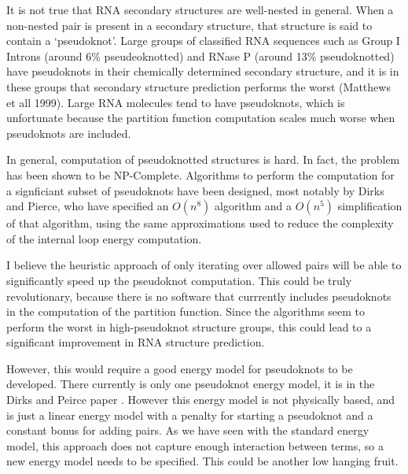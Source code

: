 It is not true that RNA secondary structures are well-nested in
general. When a non-nested pair is present in a secondary structure,
that structure is said to contain a `pseudoknot'. Large groups of
classified RNA sequences such as Group I Introns (around 6\%
pseudeoknotted) and RNase P (around 13\% pseudoknotted) have
pseudoknots in their chemically determined secondary structure, and it
is in these groups that secondary structure prediction performs the
worst (Matthews et all 1999). Large RNA molecules tend to have
pseudoknots, which is unfortunate because the partition function
computation scales much worse when pseudoknots are included.

In general, computation of pseudoknotted structures is hard. In fact,
the problem has been shown to be NP-Complete. Algorithms
to perform the computation for a signficiant subset of pseudoknots
have been designed, most notably by Dirks and Pierce, who have
specified an $O(n^8)$ algorithm and a $O(n^5)$ simplification of that
algorithm, using the same approximations used to reduce the complexity
of the internal loop energy computation.

I believe the heuristic approach of only iterating over allowed pairs
will be able to significantly speed up the pseudoknot
computation. This could be truly revolutionary, because there is no
software that currrently includes pseudoknots in the computation of
the partition function. Since the algorithms seem to perform the worst
in high-pseudoknot structure groups, this could lead to a significant
improvement in RNA structure prediction. 

However, this would require a good energy model for pseudoknots to be
developed. There currently is only one pseudoknot energy model, it is
in the Dirks and Peirce paper \cite{dirks2003partition}. However this
energy model is not physically based, and is just a linear energy
model with a penalty for starting a pseudoknot and a constant bonus
for adding pairs. As we have seen with the standard energy model, this
approach does not capture enough interaction between terms, so a new
energy model needs to be specified. This could be another low hanging
fruit. 
